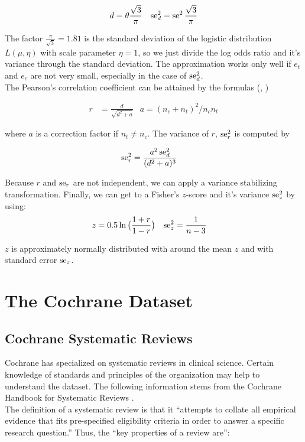 \documentclass[11pt,a4paper,twoside]{book}\usepackage[]{graphicx}\usepackage[]{color}
\begin{document}
\begin{align}
d &= \theta \frac{\sqrt{3}}{\pi} & \operatorname{se}_d^2 =  \operatorname{se}^2\frac{\sqrt{3}}{\pi} \nonumber
\end{align}

The factor $\frac{\pi}{\sqrt{3}} = 1.81$ is the standard deviation of the logistic distribution $L(\mu, \eta)$ with scale parameter $\eta = 1$, so we just divide the log odds ratio and it's variance through the standard deviation. The approximation works only well if $e_t$ and $e_c$ are not very small, especially in the case of $\operatorname{se}_d^2$. \\
The Pearson's correlation coefficient can be attained by the formulas (\citealp{olkin1985dtor}, \cite[48]{Intro.meta})

\begin{align}
r &= \frac{d}{\sqrt{d^2 + a}} & a = (n_c + n_t)^2 / n_c n_t \nonumber
\end{align}

where $a$ is a correction factor if $n_t \neq n_c$. The variance of $r$, $\operatorname{se}_r^2$ is computed by

\begin{align}
\operatorname{se}_r^2 &= \frac{a^2 \operatorname{se}_d^2}{(d^2 + a)^3} \nonumber
\end{align}

Because $r$ and $\operatorname{se}_r$ are not independent, we can apply a variance stabilizing transformation. Finally, we can get to a Fisher's $z$-score and it's variance $\operatorname{se}_z^2$ by using:
\begin{align}
z &= 0.5 \ln\big(\frac{1 + r}{1 - r}\big) & \nonumber
\operatorname{se}_z^2 &= \frac{1}{n-3}
\end{align}

$z$ is approximately normally distributed with around the mean $z$ and with standard error $\operatorname{se}_z$.













\chapter{The Cochrane Dataset} \label{ch:dataset}


\section{Cochrane Systematic Reviews}
Cochrane has specialized on systematic reviews in clinical science. Certain knowledge of standards and principles of the organization may help to understand the dataset. The following information stems from the Cochrane Handbook for Systematic Reviews \citep{cochrane.handbook}. \\
The definition of a systematic review is that it ``attempts to collate all empirical evidence that fits pre-specified eligibility criteria in order to answer a specific research question.'' Thus, the ``key properties of a review are'':
\end{document}
